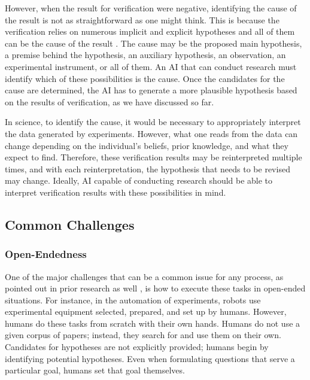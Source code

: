 However, when the result for verification were negative, identifying the cause of the result is not as straightforward as one might think. This is because the verification relies on numerous implicit and explicit hypotheses and all of them can be the cause of the result \cite{sep-scientific-underdetermination}. The cause may be the proposed main hypothesis, a premise behind the hypothesis, an auxiliary hypothesis, an observation, an experimental instrument, or all of them. An AI that can conduct research must identify which of these possibilities is the cause. Once the candidates for the cause are determined, the AI has to generate a more plausible hypothesis based on the results of verification, as we have discussed so far.

In science, to identify the cause, it would be necessary to appropriately interpret the data generated by experiments. However, what one reads from the data can change depending on the individual's beliefs, prior knowledge, and what they expect to find. Therefore, these verification results may be reinterpreted multiple times, and with each reinterpretation, the hypothesis that needs to be revised may change. Ideally, AI capable of conducting research should be able to interpret verification results with these possibilities in mind.


\subsection{Common Challenges}

\subsubsection{Open-Endedness}
One of the major challenges that can be a common issue for any process, as pointed out in prior research as well  \cite{coley2020autonomousII}, is how to execute these tasks in open-ended situations. For instance, in the automation of experiments, robots use experimental equipment selected, prepared, and set up by humans. However, humans do these tasks from scratch with their own hands. Humans do not use a given corpus of papers; instead, they search for and use them on their own. Candidates for hypotheses are not explicitly provided; humans begin by identifying potential hypotheses. Even when formulating questions that serve a particular goal, humans set that goal themselves. 

